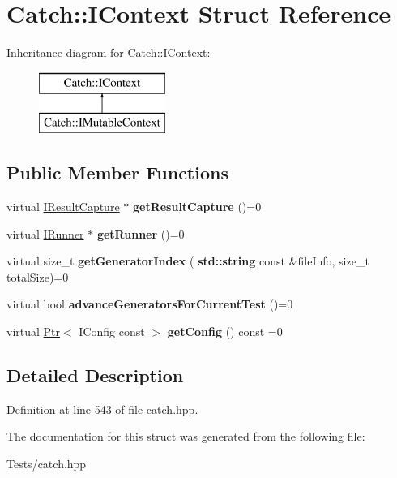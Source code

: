 \hypertarget{struct_catch_1_1_i_context}{}\section{Catch\+:\+:I\+Context Struct Reference}
\label{struct_catch_1_1_i_context}
Inheritance diagram for Catch\+:\+:I\+Context\+:\begin{figure}[H]
\begin{center}
\leavevmode
\includegraphics[height=2.000000cm]{struct_catch_1_1_i_context}
\end{center}
\end{figure}
\subsection*{Public Member Functions}
\begin{DoxyCompactItemize}
\item 
\mbox{\label{struct_catch_1_1_i_context_a684e4ae71d1fdf3060c352ecde1d122f}} 
virtual \hyperlink{struct_catch_1_1_i_result_capture}{I\+Result\+Capture} $\ast$ {\bfseries get\+Result\+Capture} ()=0
\item 
\mbox{\label{struct_catch_1_1_i_context_af088415dde18d039ed5a2f95b02767c6}} 
virtual \hyperlink{struct_catch_1_1_i_runner}{I\+Runner} $\ast$ {\bfseries get\+Runner} ()=0
\item 
\mbox{\label{struct_catch_1_1_i_context_a43e07088db43299ba129fbe6d3106e95}} 
virtual size\+\_\+t {\bfseries get\+Generator\+Index} (\textbf{ std\+::string} const \&file\+Info, size\+\_\+t total\+Size)=0
\item 
\mbox{\label{struct_catch_1_1_i_context_a806f7c4ed24d51adae90418e661b24b7}} 
virtual bool {\bfseries advance\+Generators\+For\+Current\+Test} ()=0
\item 
\mbox{\label{struct_catch_1_1_i_context_aee81c415899262e096ad8d6f686fa365}} 
virtual \hyperlink{class_catch_1_1_ptr}{Ptr}$<$ I\+Config const  $>$ {\bfseries get\+Config} () const =0
\end{DoxyCompactItemize}


\subsection{Detailed Description}


Definition at line 543 of file catch.\+hpp.



The documentation for this struct was generated from the following file\+:\begin{DoxyCompactItemize}
\item 
Tests/catch.\+hpp\end{DoxyCompactItemize}
